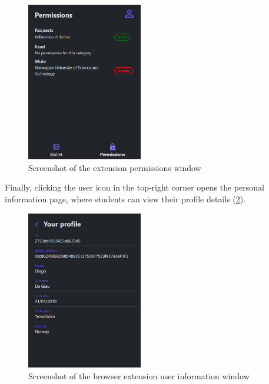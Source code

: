 \begin{figure}
  \centering
  \includegraphics[width=0.45\textwidth]{figures/Permissions.png}
  \caption[Browser extension permissions page]{Screenshot of the extension permissions window}
  \label{fig:permissionsExt}
\end{figure}

Finally, clicking the user icon in the top‐right corner opens the personal information page, where students can view their profile details (\cref{fig:userInfoExt}).

\begin{figure}
  \centering
  \includegraphics[width=0.45\textwidth]{figures/PersonalInfo.png}
  \caption[Browser extension user information page]{Screenshot of the browser extension user information window}
  \label{fig:userInfoExt}
\end{figure}

